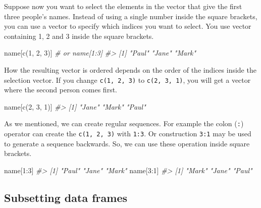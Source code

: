 \documentclass[
]{book}
\newenvironment{Shaded}{\begin{snugshade}}{\end{snugshade}}
\newcommand{\CommentTok}[1]{\textcolor[rgb]{0.56,0.35,0.01}{\textit{#1}}}
\newcommand{\DecValTok}[1]{\textcolor[rgb]{0.00,0.00,0.81}{#1}}
\newcommand{\FunctionTok}[1]{\textcolor[rgb]{0.00,0.00,0.00}{#1}}
\newcommand{\NormalTok}[1]{#1}
\newcommand{\SpecialCharTok}[1]{\textcolor[rgb]{0.00,0.00,0.00}{#1}}
\begin{document}
Suppose now you want to select the elements in the vector that give the first three people's names. Instead of using a single number inside the square brackets, you can use a vector to specify which indices you want to select. You use vector containing 1, 2 and 3 inside the square brackets.

\begin{Shaded}
\begin{Highlighting}[]
\NormalTok{name[}\FunctionTok{c}\NormalTok{(}\DecValTok{1}\NormalTok{, }\DecValTok{2}\NormalTok{, }\DecValTok{3}\NormalTok{)]  }\CommentTok{\# or name[1:3]}
\CommentTok{\#\textgreater{} [1] "Paul" "Jane" "Mark"}
\end{Highlighting}
\end{Shaded}

How the resulting vector is ordered depends on the order of the indices inside the selection vector. If you change \texttt{c(1,\ 2,\ 3)} to \texttt{c(2,\ 3,\ 1)}, you will get a vector where the second person comes first.

\begin{Shaded}
\begin{Highlighting}[]
\NormalTok{name[}\FunctionTok{c}\NormalTok{(}\DecValTok{2}\NormalTok{, }\DecValTok{3}\NormalTok{, }\DecValTok{1}\NormalTok{)]}
\CommentTok{\#\textgreater{} [1] "Jane" "Mark" "Paul"}
\end{Highlighting}
\end{Shaded}

As we mentioned, we can create regular sequences. For example the colon (\texttt{:}) operator can create the \texttt{c(1,\ 2,\ 3)} with \texttt{1:3}. Or construction \texttt{3:1} may be used to generate a sequence backwards.
So, we can use these operation inside square brackets.

\begin{Shaded}
\begin{Highlighting}[]
\NormalTok{name[}\DecValTok{1}\SpecialCharTok{:}\DecValTok{3}\NormalTok{]}
\CommentTok{\#\textgreater{} [1] "Paul" "Jane" "Mark"}
\NormalTok{name[}\DecValTok{3}\SpecialCharTok{:}\DecValTok{1}\NormalTok{]}
\CommentTok{\#\textgreater{} [1] "Mark" "Jane" "Paul"}
\end{Highlighting}
\end{Shaded}

\hypertarget{subsetting-data-frames}{%
\subsection{Subsetting data frames}\label{subsetting-data-frames}}
\end{document}
